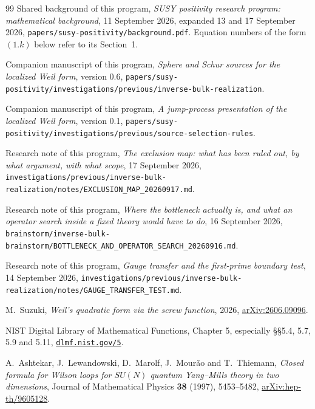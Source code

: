 \begin{thebibliography}{99}
Shared background of this program, \emph{SUSY positivity research program:
mathematical background}, 11 September 2026, expanded 13 and 17 September 2026,
\texttt{papers/susy-positivity/background.pdf}. Equation numbers of the form
$(1.k)$ below refer to its Section~1.

Companion manuscript of this program, \emph{Sphere and Schur sources for the
localized Weil form}, version 0.6,
\texttt{papers/susy-positivity/investigations/\allowbreak previous/\allowbreak inverse-bulk-realization}.

Companion manuscript of this program, \emph{A jump-process presentation of the
localized Weil form}, version 0.1,
\texttt{papers/susy-positivity/investigations/\allowbreak previous/\allowbreak source-selection-rules}.

Research note of this program, \emph{The exclusion map: what has been ruled out,
by what argument, with what scope}, 17 September 2026,
\texttt{investigations/\allowbreak previous/\allowbreak inverse-bulk-realization/\allowbreak notes/\allowbreak EXCLUSION\_MAP\_20260917.md}.

Research note of this program, \emph{Where the bottleneck actually is, and what
an operator search inside a fixed theory would have to do}, 16 September 2026,
\texttt{brainstorm/inverse-bulk-brainstorm/BOTTLENECK\_AND\_OPERATOR\_SEARCH\_20260916.md}.

Research note of this program, \emph{Gauge transfer and the first-prime boundary
test}, 14 September 2026,
\texttt{investigations/\allowbreak previous/\allowbreak inverse-bulk-realization/\allowbreak notes/\allowbreak GAUGE\_TRANSFER\_TEST.md}.

M.~Suzuki, \emph{Weil's quadratic form via the screw function}, 2026,
\href{https://arxiv.org/abs/2606.09096}{arXiv:2606.09096}.

NIST Digital Library of Mathematical Functions, Chapter 5,
especially \S\S5.4, 5.7, 5.9 and 5.11,
\href{https://dlmf.nist.gov/5}{\texttt{dlmf.nist.gov/5}}.

A.~Ashtekar, J.~Lewandowski, D.~Marolf, J.~Mour\~ao and T.~Thiemann,
\emph{Closed formula for Wilson loops for $SU(N)$ quantum Yang--Mills theory in
two dimensions}, Journal of Mathematical Physics \textbf{38} (1997), 5453--5482,
\href{https://arxiv.org/abs/hep-th/9605128}{arXiv:hep-th/9605128}.


\end{thebibliography}
